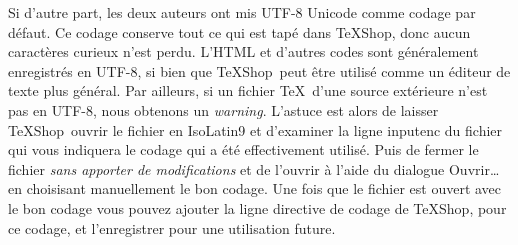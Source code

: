 \documentclass[11pt,french]{article}
\newcommand{\TS}{\textsf{\TeX Shop}}
\newcommand{\acr}[1]{\textsf{#1}}
\newcommand{\cmd}[1]{\textsf{#1}}
\begin{document}
Si d'autre part, les deux auteurs ont mis \acr{UTF-8 Unicode} comme codage par défaut. Ce codage conserve tout ce qui est tapé dans \TS, donc aucun caractères curieux n'est perdu. L'HTML et d'autres codes sont généralement enregistrés en \acr{UTF-8}, si bien que \TS\ peut être utilisé comme un éditeur de texte plus général. Par ailleurs, si un fichier \TeX\ d'une source extérieure n'est pas en \acr{UTF-8}, nous obtenons un \emph{warning}. L'astuce est alors de laisser \TS\ ouvrir le fichier en \acr{IsoLatin9} et d'examiner la ligne \cmd{inputenc} du fichier qui vous indiquera le codage qui a été effectivement utilisé. Puis de fermer le fichier \emph{sans apporter de modifications} et de l'ouvrir à l'aide du dialogue \cmd{Ouvrir…} en choisisant manuellement le bon codage. Une fois que le fichier est ouvert avec le bon codage vous pouvez ajouter la ligne directive de codage de \TS, pour ce codage, et l'enregistrer pour une utilisation future.
\end{document}
